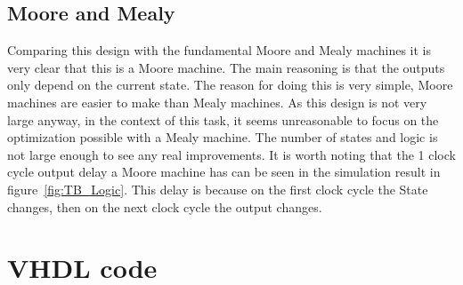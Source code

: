 \documentclass{article}
\begin{document}
\subsection{Moore and Mealy}
Comparing this design with the fundamental Moore and Mealy machines it is very clear that this is a Moore machine. The main reasoning is that the outputs only depend on the current state. The reason for doing this is very simple, Moore machines are easier to make than Mealy machines. As this design is not very large anyway, in the context of this task, it seems unreasonable to focus on the optimization possible with a Mealy machine. The number of states and logic is not large enough to see any real improvements. It is worth noting that the 1 clock cycle output delay a Moore machine has can be seen in the simulation result in figure~\ref{fig:TB_Logic}. This delay is because on the first clock cycle the State changes, then on the next clock cycle the output changes.

\section{VHDL code}
\end{document}
